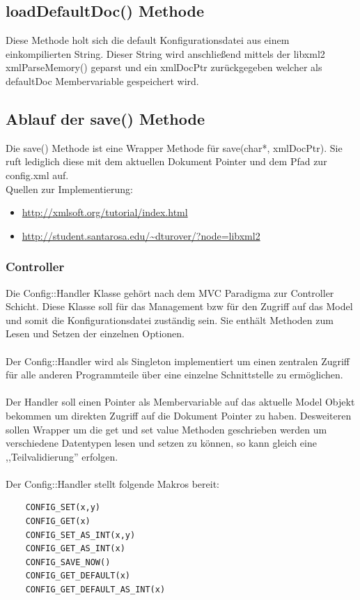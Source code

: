 \subsection{loadDefaultDoc() Methode}
Diese Methode holt sich die default Konfigurationsdatei aus einem einkompilierten String.
Dieser String wird anschließend mittels der libxml2 xmlParseMemory() geparst und ein xmlDocPtr zurückgegeben welcher als defaultDoc Membervariable gespeichert wird.

\subsection{Ablauf der save() Methode}
Die save() Methode ist eine Wrapper Methode für save(char*, xmlDocPtr). Sie ruft lediglich diese mit dem aktuellen Dokument Pointer und dem Pfad zur config.xml auf.
\\
Quellen zur Implementierung:
\begin{itemize}
    \item \url{http://xmlsoft.org/tutorial/index.html}
    \item \url{http://student.santarosa.edu/~dturover/?node=libxml2}
\end{itemize}

%
%


\subsubsection{Controller}
Die Config::Handler Klasse gehört nach dem MVC Paradigma zur Controller Schicht. Diese Klasse soll für das Management bzw für den
Zugriff auf das Model und somit die Konfigurationsdatei zuständig sein. Sie enthält Methoden zum Lesen und Setzen der einzelnen Optionen.
\\
\\
Der Config::Handler wird als Singleton implementiert um einen zentralen Zugriff für alle anderen Programmteile über eine einzelne Schnittstelle zu ermöglichen.
\\
\\
Der Handler soll einen Pointer als Membervariable auf das aktuelle Model Objekt bekommen um direkten Zugriff auf die Dokument Pointer
zu haben. Desweiteren sollen Wrapper um die get und set value Methoden geschrieben werden um verschiedene Datentypen lesen und setzen zu können, so kann gleich eine ,,Teilvalidierung'' erfolgen.
\\
\\
Der Config::Handler stellt folgende Makros bereit:
    \begin{verbatim}
    CONFIG_SET(x,y) 
    CONFIG_GET(x)   
    CONFIG_SET_AS_INT(x,y) 
    CONFIG_GET_AS_INT(x)   
    CONFIG_SAVE_NOW() 
    CONFIG_GET_DEFAULT(x)
    CONFIG_GET_DEFAULT_AS_INT(x)
    \end{verbatim}

